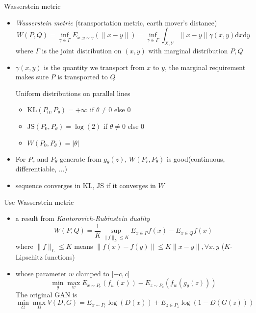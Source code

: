 \documentclass[9pt]{beamer}
\newcommand{\mathd}{\mathrm{d}}
\begin{document}
\begin{frame}{Wasserstein metric}
  \begin{itemize}
  \item \emph{Wasserstein metric} (transportation metric, earth mover's distance)
    \[ W (P, Q) = \inf_{\gamma \in \Gamma} E_{x, y \sim \gamma} (\| x - y \|) =
   \inf_{\gamma \in \Gamma} \int_{X, Y} \| x - y \| \gamma (x, y) \mathd x
   \mathd y \]
    where $\Gamma$ is the joint distribution on $(x,y)$ with marginal
    distribution $P,Q$
  \item $\gamma(x,y)$ is the quantity we transport from $x$ to $y$,
    the marginal requirement makes sure $P$ is transported to $Q$
  \begin{block}{Uniform distributions on parallel lines}
    \begin{center}
    \end{center}
  \end{block}
    \begin{itemize}
    \item $\text{KL}(P_0, P_\theta)=+\infty$ if $\theta \not= 0$ else $0$
    \item $\text{JS}(P_0, P_\theta)=\log(2)$ if $\theta \not= 0$ else $0$
    \item $W(P_0, P_\theta)=|\theta|$
    \end{itemize}
  \item For $P_r$ and $P_\theta$ generate from $g_\theta(z)$, $W(P_r,
    P_\theta)$ is good(continuous, differentiable, ...)
  \item sequence converges in KL, JS if it converges in $W$
  \end{itemize}
\end{frame}

\begin{frame}{Use Wasserstein metric}
  \begin{itemize}
  \item a result from \emph{Kantorovich-Rubinstein duality}
    \[ W (P, Q) = \frac{1}{K} \sup_{\| f \|_L \leqslant K} E_{x \in P} f (x) -
   E_{x \in Q} f (x) \] where $\|f\|_L\leqslant K$ means $\| f (x) - f
   (y) \| \leqslant K \| x - y \|, \forall x, y$ ($K$-Lipschitz functions)
 \item whose parameter $w$ clamped to $[-c, c$]
   \[ \min_{\theta} \max_w E_{x \sim P_r} (f_w (x)) - E_{z \sim P_z} (f_w
   (g_{\theta} (z))) \]
   The original GAN is
  $$ \min_G \max_D V(D,G) = E_{x \sim P_r} \log (D (x)) + E_{z \in P_z
   } \log (1 - D (G (z))) $$
 \end{itemize}
\end{frame}
\end{document}
